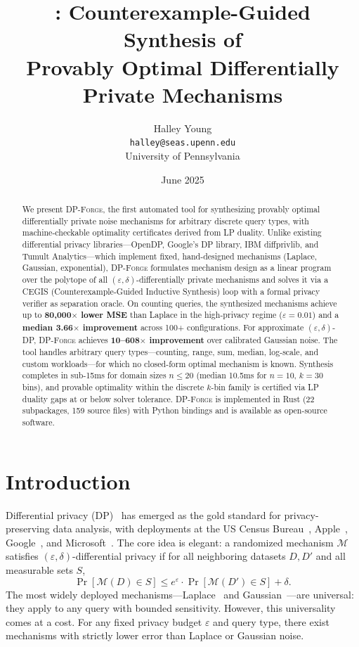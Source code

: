 \documentclass[11pt,a4paper]{article}
\title{\dpforge{}: Counterexample-Guided Synthesis of\\Provably Optimal Differentially Private Mechanisms}
\author{Halley Young\\
\texttt{halley@seas.upenn.edu}\\
University of Pennsylvania}
\date{June 2025}
\newcommand{\dpforge}{\textsc{DP-Forge}}
\newcommand{\eps}{\varepsilon}
\newcommand{\cM}{\mathcal{M}}
\begin{document}
\maketitle


\begin{abstract}
We present \dpforge{}, the first automated tool for synthesizing provably optimal
differentially private noise mechanisms for arbitrary discrete query types, with
machine-checkable optimality certificates derived from LP duality.
Unlike existing differential privacy libraries---OpenDP, Google's DP library,
IBM diffprivlib, and Tumult Analytics---which implement fixed, hand-designed mechanisms
(Laplace, Gaussian, exponential), \dpforge{} formulates mechanism design as a linear
program over the polytope of all $(\eps,\delta)$-differentially private mechanisms
and solves it via a CEGIS (Counterexample-Guided Inductive Synthesis) loop with
a formal privacy verifier as separation oracle.
On counting queries, the synthesized mechanisms achieve up to
\textbf{80,000$\times$ lower MSE} than Laplace in the high-privacy regime
($\eps=0.01$) and a \textbf{median 3.66$\times$ improvement} across 100+
configurations.  For approximate $(\eps,\delta)$-DP, \dpforge{} achieves
\textbf{10--608$\times$ improvement} over calibrated Gaussian noise.
The tool handles arbitrary query types---counting, range, sum, median,
log-scale, and custom workloads---for which no closed-form optimal mechanism
is known.  Synthesis completes in sub-15ms for domain sizes $n \le 20$
(median 10.5ms for $n=10$, $k=30$ bins), and provable optimality within the
discrete $k$-bin family is certified via LP duality gaps at or below solver
tolerance.  \dpforge{} is implemented in Rust (22 subpackages, 159 source files)
with Python bindings and is available as open-source software.
\end{abstract}

\tableofcontents
\newpage


\section{Introduction}
\label{sec:introduction}

Differential privacy (DP)~\cite{dwork2006calibrating,dwork2014algorithmic} has
emerged as the gold standard for privacy-preserving data analysis, with
deployments at the US Census Bureau~\cite{abowd2018us}, Apple~\cite{apple2017},
Google~\cite{erlingsson2014rappor}, and Microsoft~\cite{ding2017collecting}.
The core idea is elegant: a randomized mechanism $\cM$ satisfies
$(\eps,\delta)$-differential privacy if for all neighboring datasets $D, D'$
and all measurable sets $S$,
\[
  \Pr[\cM(D) \in S] \le e^{\eps} \cdot \Pr[\cM(D') \in S] + \delta.
\]
The most widely deployed mechanisms---Laplace~\cite{dwork2006calibrating} and
Gaussian~\cite{balle2018improving}---are universal: they apply to any query
with bounded sensitivity.  However, this universality comes at a cost.
For any fixed privacy budget $\eps$ and query type, there exist mechanisms with
strictly lower error than Laplace or Gaussian noise.
\end{document}
